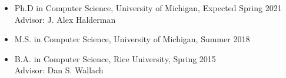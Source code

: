 \documentclass[11pt]{article}
\begin{document}
\begin{itemize}[label={--\ },leftmargin=0.25in,labelsep=0.1625em]\addtolength{\itemsep}{-0.25\baselineskip}

        \item Ph.D in Computer Science, University of Michigan, Expected Spring 2021\\
        Advisor: J. Alex Halderman
		
        \item M.S. in Computer Science, University of Michigan, Summer 2018

        \item B.A. in Computer Science, Rice University, Spring 2015\\
        Advisor: Dan S. Wallach
        
\end{itemize}

\end{document}
